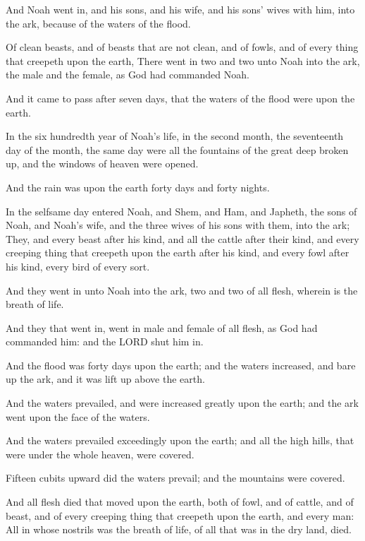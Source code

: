 \verse And Noah went in, and his sons, and his wife, and his sons' wives with him, into the ark, because of the waters of the flood.

\verse Of clean beasts, and of beasts that are not clean, and of fowls, and of every thing that creepeth upon the earth, \verse There went in two and two unto Noah into the ark, the male and the female, as God had commanded Noah.

\verse And it came to pass after seven days, that the waters of the flood were upon the earth.

\verse In the six hundredth year of Noah's life, in the second month, the seventeenth day of the month, the same day were all the fountains of the great deep broken up, and the windows of heaven were opened.

\verse And the rain was upon the earth forty days and forty nights.

\verse In the selfsame day entered Noah, and Shem, and Ham, and Japheth, the sons of Noah, and Noah's wife, and the three wives of his sons with them, into the ark; \verse They, and every beast after his kind, and all the cattle after their kind, and every creeping thing that creepeth upon the earth after his kind, and every fowl after his kind, every bird of every sort.

\verse And they went in unto Noah into the ark, two and two of all flesh, wherein is the breath of life.

\verse And they that went in, went in male and female of all flesh, as God had commanded him: and the LORD shut him in.

\verse And the flood was forty days upon the earth; and the waters increased, and bare up the ark, and it was lift up above the earth.

\verse And the waters prevailed, and were increased greatly upon the earth; and the ark went upon the face of the waters.

\verse And the waters prevailed exceedingly upon the earth; and all the high hills, that were under the whole heaven, were covered.

\verse Fifteen cubits upward did the waters prevail; and the mountains were covered.

\verse And all flesh died that moved upon the earth, both of fowl, and of cattle, and of beast, and of every creeping thing that creepeth upon the earth, and every man: \verse All in whose nostrils was the breath of life, of all that was in the dry land, died.

